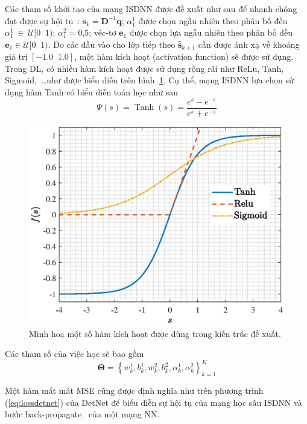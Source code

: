 Các tham số khởi tạo của mạng ISDNN được đề xuất như sau để nhanh chóng đạt được sự hội tụ~\cite{Narasimhan2014}: $\hat{\mathbf{s}}_1 = \mathbf{D}^{-1}\mathbf{q}$; $\alpha^1_1$ được chọn ngẫu nhiên theo phân bố đều $\alpha^1_1~\in~\mathcal{U}[0 \;\; 1)$; $\alpha^2_1 = 0$,$5$; véc-tơ $\mathbf{e}_1$ được chọn lựa ngẫu nhiên theo phân bố đều $\mathbf{e}_1 \in  \mathcal{U}[0 \;\; 1)$. Do các đầu vào cho lớp tiếp theo $\hat{\mathbf{s}}_{k+1}$ cần được ánh xạ về khoảng giá trị $[-1.0 \;\; 1.0]$, một hàm kích hoạt (activation function) sẽ được sử dụng. Trong DL, có nhiều hàm kích hoạt được sử dụng rộng rãi như ReLu, Tanh, Sigmoid,~\ldots như được biểu diễn trên hình~\ref{fig:tanh}. Cụ thể, mạng ISDNN lựa chọn sử dụng hàm Tanh có biểu diễn toán học như sau
\begin{equation}
    \Psi(s) = \operatorname{Tanh}(s) = \frac{e^s - e^{-s}}{e^s + e^{-s}}
\end{equation}
\begin{figure}[ht]
    \centering
    \includegraphics[width=.8\linewidth]{figures/tanh.eps}
    \caption{Minh hoạ một số hàm kích hoạt được dùng trong kiến trúc đề xuất.}
    \label{fig:tanh}
\end{figure}

Các tham số của việc học sẽ bao gồm 
\begin{equation}
\boldsymbol{\Theta}=\left\{w^1_{k}, b^1_{k}, w^2_{k}, b^2_{k}, \alpha^1_k, \alpha^2_k \right\}_{k=1}^K
\end{equation}

Một hàm mất mát MSE cũng được định nghĩa như trên phương trình (\ref{eq:lossdetnet}) của DetNet để biểu diễn sự hội tụ của mạng học sâu ISDNN và bước back-propagate~\cite{LeCun2015} của một mạng NN.

